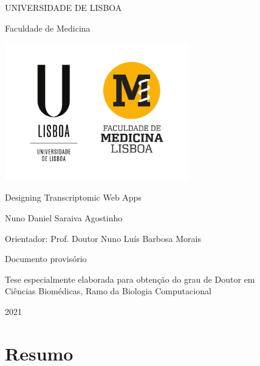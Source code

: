 \documentclass[12pt, twoside]{report}
\begin{document}
\begin{titlepage}
    \begin{center}
        \vspace*{-.2cm}
        UNIVERSIDADE DE LISBOA
        
        Faculdade de Medicina
        
        \includegraphics[width=0.6\textwidth]{images/logo/ulisboa}
        
        \vspace{1.8cm}
        Designing Transcriptomic Web Apps

        \vspace{1.1cm}        
            
        \vspace{0.9cm}            
        Nuno Daniel Saraiva Agostinho
    \end{center}

    \vspace{0.9cm}
    Orientador: Prof. Doutor Nuno Luís Barbosa Morais
    
    \vspace{2.2cm}
    \begin{center}
        Documento provisório
        
        Tese especialmente elaborada para obtenção do grau de Doutor em\\
        Ciências Biomédicas, Ramo da Biologia Computacional
            
        \vfill
        2021
        \vspace{.7cm}    
    \end{center}
\end{titlepage}

\tableofcontents

\chapter*{Resumo}
\end{document}
